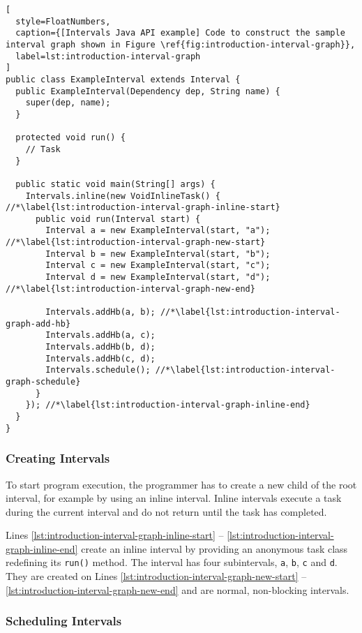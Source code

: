 \begin{lstlisting}[
  style=FloatNumbers, 
  caption={[Intervals Java API example] Code to construct the sample interval graph shown in Figure \ref{fig:introduction-interval-graph}},
  label=lst:introduction-interval-graph
]
public class ExampleInterval extends Interval {
  public ExampleInterval(Dependency dep, String name) {
    super(dep, name);
  }
  
  protected void run() {
    // Task
  }
  
  public static void main(String[] args) {
    Intervals.inline(new VoidInlineTask() { //*\label{lst:introduction-interval-graph-inline-start}
      public void run(Interval start) {
        Interval a = new ExampleInterval(start, "a"); //*\label{lst:introduction-interval-graph-new-start}
        Interval b = new ExampleInterval(start, "b");
        Interval c = new ExampleInterval(start, "c");
        Interval d = new ExampleInterval(start, "d"); //*\label{lst:introduction-interval-graph-new-end}
        
        Intervals.addHb(a, b); //*\label{lst:introduction-interval-graph-add-hb}
        Intervals.addHb(a, c);
        Intervals.addHb(b, d);
        Intervals.addHb(c, d);
        Intervals.schedule(); //*\label{lst:introduction-interval-graph-schedule}
      }
    }); //*\label{lst:introduction-interval-graph-inline-end}
  }
}
\end{lstlisting}

\subsubsection{Creating Intervals}
\label{sec:intro-intervals-creating-intervals}

To start program execution, the programmer has to create a new child
of the root interval, for example by using an inline interval. Inline
intervals execute a task during the current interval and do not return
until the task has completed.

Lines \ref{lst:introduction-interval-graph-inline-start} --
\ref{lst:introduction-interval-graph-inline-end} create an inline interval by
providing an anonymous task class redefining its \lstinline!run()!
method. The interval has four subintervals, \lstinline!a!,
\lstinline!b!, \lstinline!c! and \lstinline!d!. They are created on
Lines \ref{lst:introduction-interval-graph-new-start} --
\ref{lst:introduction-interval-graph-new-end} and are normal, non-blocking
intervals.

\subsubsection{Scheduling Intervals}
\label{sec:intro-intervals-scheduling-intervals}

